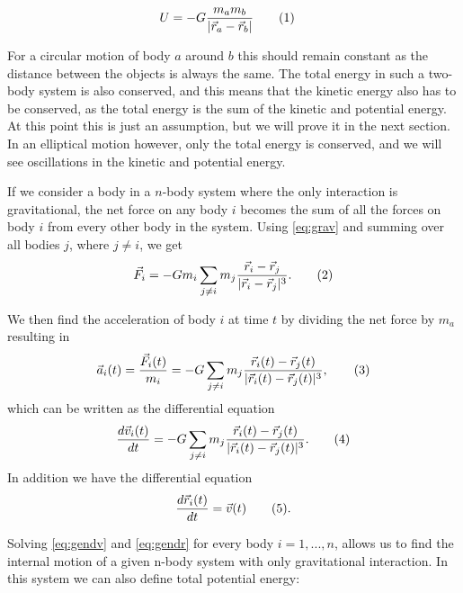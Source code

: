 \documentclass[reprint,english,notitlepage]{revtex4-1}  %
\newcommand\numberthis{\addtocounter{equation}{1}\tag{\theequation}}
\begin{document}
\begin{align*}
U &= - G \frac{m_a m_b}{|\vec{r}_a - \vec{r}_b|} \numberthis \label{eq:pot_en}
\end{align*}

For a circular motion of body $a$ around $b$ this should remain constant as the distance between the objects is always the same. The total energy in such a two-body system is also conserved, and this means that the kinetic energy also has to be conserved, as the total energy is the sum of the kinetic and potential energy. At this point this is just an assumption, but we will prove it in the next section. In an elliptical motion however, only the total energy is conserved, and we will see oscillations in the kinetic and potential energy.

If we consider a body in a \(n\)-body system where the only interaction is gravitational, the net force on any body \(i\) becomes the sum of all the forces on body \(i\) from every other body in the system. Using \eqref{eq:grav} and summing over all bodies \(j\), where \(j\neq i\), we get
\begin{align*}
	\vec{F}_{i} = -Gm_{i}\sum_{j\neq i}m_{j}\frac{\vec{r}_{i}-\vec{r}_{j}}{|\vec{r}_{i}-\vec{r}_{j}|^{3}}. \numberthis \label{eq:gengrav}
\end{align*}

We then find the acceleration of body \(i\) at time \(t\) by dividing the net force by \(m_{a}\) resulting in
\begin{align*}
	\vec{a}_{i}(t) = \frac{\vec{F}_{i}(t)}{m_{i}} = -G\sum_{j\neq i}m_{j}\frac{\vec{r}_{i}(t)-\vec{r}_{j}(t)}{|\vec{r}_{i}(t)-\vec{r}_{j}(t)|^{3}}, \numberthis \label{eq:accel}
\end{align*}
which can be written as the differential equation
\begin{align*}
 	\frac{d\vec{v}_{i}(t)}{dt} = -G\sum_{j\neq i}m_{j}\frac{\vec{r}_{i}(t)-\vec{r}_{j}(t)}{|\vec{r}_{i}(t)-\vec{r}_{j}(t)|^{3}}. \numberthis \label{eq:gendv}
\end{align*}
In addition we have the differential equation
\begin{align*}
	\frac{d\vec{r}_{i}(t)}{dt} = \vec{v}(t) \numberthis \label{eq:gendr}.
\end{align*}

Solving \eqref{eq:gendv} and \eqref{eq:gendr} for every body \(i=1, ..., n\), allows us to find the internal motion of a given n-body system with only gravitational interaction. In this system we can also define total potential energy:
\end{document}
